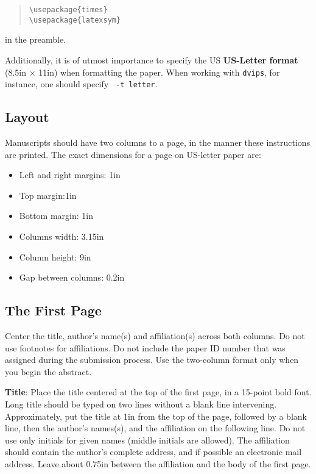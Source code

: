 \documentclass[10pt]{article}
\begin{document}
\begin{quote}
\begin{verbatim}
\usepackage{times}
\usepackage{latexsym}
\end{verbatim}
\end{quote}
in the preamble.

Additionally, it is of utmost importance to specify the US {\bf
  US-Letter format} (8.5in $\times$ 11in) when formatting the paper.
When working with {\tt dvips}, for instance, one should specify {\tt
  -t letter}.


\subsection{Layout}
\label{ssec:layout}

Manuscripts should have two columns to a page, in the manner these
instructions are printed. The exact dimensions for a page on US-letter
paper are:

\begin{itemize}
\item Left and right margins: 1in
\item Top margin:1in
\item Bottom margin: 1in
\item Columns width: 3.15in
\item Column height: 9in
\item Gap between columns: 0.2in
\end{itemize}


\subsection{The First Page}
\label{ssec:first}

Center the title, author's name(s) and affiliation(s) across both
columns. Do not use footnotes for affiliations.  Do not include the
paper ID number that was assigned during the submission process. 
Use the two-column format only when you begin the abstract.

{\bf Title}: Place the title centered at the top of the first page, in
a 15-point bold font. Long title should be typed on two lines without
a blank line intervening. Approximately, put the title at 1in from the
top of the page, followed by a blank line, then the author's names(s),
and the affiliation on the following line.  Do not use only initials
for given names (middle initials are allowed). The affiliation should
contain the author's complete address, and if possible an electronic
mail address. Leave about 0.75in between the affiliation and the body
of the first page.
\end{document}

